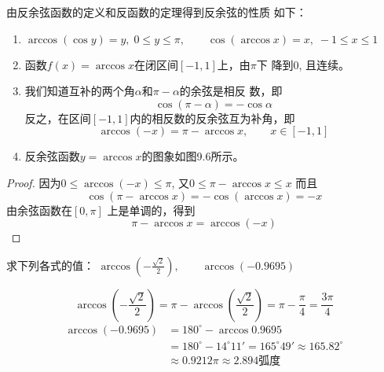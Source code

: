 由反余弦函数的定义和反函数的定理得到反余弦的性质
如下：
\begin{enumerate}
\item $\arccos(\cos y)=y,\; 0\le y\le \pi,\qquad \cos(\arccos x)=x,\; -1\le x\le 1$
\item 函数$f(x)=\arccos x$在闭区间$[-1,1]$上，由$\pi$下
降到0, 且连续。
\item 我们知道互补的两个角$\alpha$和$\pi-\alpha$的余弦是相反
数，即
\[\cos(\pi-\alpha)=-\cos\alpha\]
反之，在区间$[-1,1]$内的相反数的反余弦互为补角，即
\[\arccos(-x)=\pi-\arccos x,\qquad x\in [-1,1]\]

\item 反余弦函数$y=\arccos x$的图象如图9.6所示。
\begin{figure}[htp]
    \centering
{}
    \caption{}
\end{figure}
\end{enumerate}

\begin{proof}
    因为$0\le \arccos(-x)\le \pi$, 又$0\le \pi -\arccos x\le x$
而且
\[\cos(\pi -\arccos x)=-\cos(\arccos x)=-x\]
由余弦函数在$[0,\pi]$ 上是单调的，得到
\[\pi -\arccos x=\arccos (-x)\]
\end{proof}

\begin{example}
    求下列各式的值：
$\arccos\left(-\frac{\sqrt{2}}{2}\right),\qquad \arccos(-0.9695)$
\end{example}


\begin{solution}
\[\arccos\left(-\frac{\sqrt{2}}{2}\right)=\pi-\arccos\left(\frac{\sqrt{2}}{2}\right)=\pi-\frac{\pi}{4}=\frac{3\pi}{4}\]
\[\begin{split}
    \arccos(-0.9695)&=180^{\circ}-\arccos0.9695\\
    &=180^{\circ}-14^{\circ}11'=165^{\circ}49'\approx 165.82^{\circ}\\
    &\approx 0.9212\pi\approx 2.894\text{弧度}
\end{split}\]
\end{solution}


